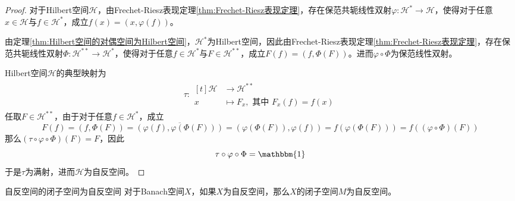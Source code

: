 \documentclass[lang = cn, scheme = chinese, thmcnt = section]{elegantbook}
\begin{document}
\begin{proof}
	对于Hilbert空间$\mathcal{H}$，由Frechet-Riesz表现定理\ref{thm:Frechet-Riesz表现定理}，存在保范共轭线性双射$\varphi:\mathcal{H}^*\to \mathcal{H}$，使得对于任意$x\in \mathcal{H}$与$f\in \mathcal{H}^*$，成立$f(x)=(x,\varphi(f))$。
	
	
	由定理\ref{thm:Hilbert空间的对偶空间为Hilbert空间}，$\mathcal{H}^*$为Hilbert空间，因此由Frechet-Riesz表现定理\ref{thm:Frechet-Riesz表现定理}，存在保范共轭线性双射$\Phi:\mathcal{H}^{**}\to \mathcal{H}^*$，使得对于任意$f\in \mathcal{H}^*$与$F\in \mathcal{H}^{**}$，成立$F(f)=(f,\Phi(F))$。进而$\varphi\circ\Phi$为保范线性双射。

	Hilbert空间$\mathcal{H}$的典型映射为
	\begin{align*}
		\tau:\begin{aligned}[t]
			\mathcal{H}&\longrightarrow \mathcal{H}^{**}\\
			x&\longmapsto F_x,\text{ 其中 }F_x(f)=f(x)
		\end{aligned}
	\end{align*}
	任取$F\in \mathcal{H}^{**}$，由于对于任意$f\in\mathcal{H}^*$，成立
	$$
	F(f)
	=(f,\Phi(F))
	=\overline{(\varphi(f),\varphi(\Phi(F)))}
	=(\varphi(\Phi(F)),\varphi(f))
	=f(\varphi(\Phi(F)))
	=f((\varphi\circ\Phi)(F))
	$$
	那么$(\tau\circ\varphi\circ\Phi)(F)=F$，因此
	$$
	\tau\circ\varphi\circ\Phi=\mathbbm{1}
	$$
	于是$\tau$为满射，进而$\mathcal{H}$为自反空间。
\end{proof}

\begin{theorem}{}{自反空间的闭子空间为自反空间}
	对于Banach空间$X$，如果$X$为自反空间，那么$X$的闭子空间$M$为自反空间。
\end{theorem}
\end{document}
